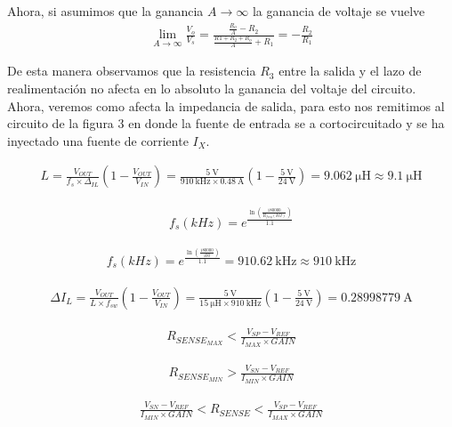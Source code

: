 \documentclass[12pt,a4paper]{article}
\begin{document}
	Ahora, si asumimos que la ganancia $A \rightarrow \infty$ la ganancia de voltaje se vuelve
	\begin{align}
		\lim_{A \to \infty} \frac{V_o}{V_s} = \frac{ \frac{R_o}{A} - R_2 }{ \frac{R1 + R_2 + R_o}{A} + R_1} = -\frac{R_2}{R_1}
	\end{align}

	De esta manera observamos que la resistencia $R_3$ entre la salida y el lazo de realimentación no afecta en lo absoluto la ganancia del voltaje del circuito.  Ahora, veremos como afecta la impedancia de salida, para esto nos remitimos al circuito de la figura 3 en donde la fuente de entrada se a cortocircuitado y se ha inyectado una fuente de corriente $I_X$.
	
	
	\begin{align}
		L = \frac{V_{OUT}}{f_s \times \Delta_{IL}} \left( 1 - \frac{V_{OUT}}{V_{IN}} \right) = \frac{\qty{5}{\volt}}{\qty{910}{\kilo \hertz} \times \qty{0.48}{\ampere}} \left( 1 - \frac{\qty{5}{\volt}}{\qty{24}{\volt}} \right) = \qty{9.062}{\micro \henry} \approx \qty{9.1}{\micro \henry}
	\end{align}
	
	
	\begin{align}
		f_s (kHz) = e^{\frac{ \ln \left( \frac{180000}{R_{freq}(k\Omega)} \right) }{1.1}}
	\end{align}
	
	\begin{align}
		f_s (kHz) = e^{\frac{ \ln \left( \frac{180000}{100} \right) }{1.1}} = \qty{910.62}{\kilo \hertz} \approx \qty{910}{\kilo \hertz}
	\end{align}
	
	\begin{align}
		\Delta I_L = \frac{V_{OUT}}{L \times f_{sw}} \left( 1 - \frac{V_{OUT}}{V_{IN}} \right) = \frac{\qty{5}{\volt}}{\qty{15}{\micro \henry} \times \qty{910}{\kilo \hertz}} \left( 1 - \frac{\qty{5}{\volt}}{\qty{24}{\volt} } \right) = \qty{0.28998779}{ \ampere}
	\end{align}
	
	\begin{align}
		R_{SENSE_{MAX}} < \frac{V_{SP} - V_{REF}}{I_{MAX} \times GAIN} \nonumber
	\end{align}
	
	\begin{align}
		R_{SENSE_{MIN}} > \frac{V_{SN} - V_{REF}}{I_{MIN} \times GAIN} \nonumber
	\end{align}
	
	
		\begin{align}
		\frac{V_{SN} - V_{REF}}{I_{MIN} \times GAIN} < R_{SENSE} < \frac{V_{SP} - V_{REF}}{I_{MAX} \times GAIN} \nonumber
	\end{align}
	
\end{document}
